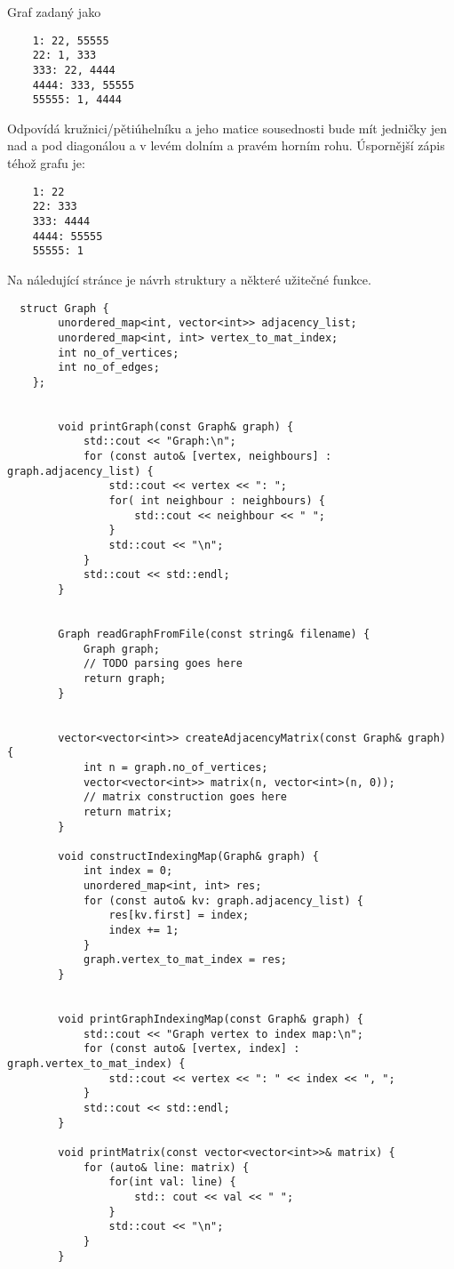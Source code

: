 \documentclass[12pt,oneside]{article}
\begin{document}
	Graf zadaný jako
	\begin{verbatim}
	1: 22, 55555
	22: 1, 333
	333: 22, 4444
	4444: 333, 55555
	55555: 1, 4444
	\end{verbatim}
	Odpovídá kružnici/pětiúhelníku a jeho matice sousednosti bude mít jedničky jen nad a pod diagonálou a v levém dolním a pravém horním rohu.
	Úspornější zápis téhož grafu je:
	\begin{verbatim}
	1: 22
	22: 333
	333: 4444
	4444: 55555
	55555: 1
\end{verbatim}


	Na náledující stránce je návrh struktury a některé užitečné funkce.
	
	\newpage
	\begin{lstlisting}
  struct Graph {
		unordered_map<int, vector<int>> adjacency_list;
		unordered_map<int, int> vertex_to_mat_index;
		int no_of_vertices;
		int no_of_edges;
    };
		
		
		void printGraph(const Graph& graph) {
			std::cout << "Graph:\n";
			for (const auto& [vertex, neighbours] : graph.adjacency_list) {
				std::cout << vertex << ": ";
				for( int neighbour : neighbours) {
					std::cout << neighbour << " ";
				}
				std::cout << "\n";
			}
			std::cout << std::endl;
		}
		
		
		Graph readGraphFromFile(const string& filename) {
			Graph graph;
			// TODO parsing goes here
			return graph;
		}
		
		
		vector<vector<int>> createAdjacencyMatrix(const Graph& graph) {
			int n = graph.no_of_vertices;
			vector<vector<int>> matrix(n, vector<int>(n, 0));
			// matrix construction goes here
			return matrix;
		}
		
		void constructIndexingMap(Graph& graph) {
			int index = 0;
			unordered_map<int, int> res;
			for (const auto& kv: graph.adjacency_list) {
				res[kv.first] = index;
				index += 1;
			}
			graph.vertex_to_mat_index = res;
		}
		
		
		void printGraphIndexingMap(const Graph& graph) {
			std::cout << "Graph vertex to index map:\n";
			for (const auto& [vertex, index] : graph.vertex_to_mat_index) {
				std::cout << vertex << ": " << index << ", ";
			}
			std::cout << std::endl;
		}
		
		void printMatrix(const vector<vector<int>>& matrix) {
			for (auto& line: matrix) {
				for(int val: line) {
					std:: cout << val << " ";
				}
				std::cout << "\n";
			}
		}
	\end{lstlisting}
	
\end{document}
